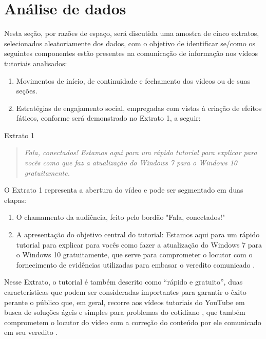 \documentclass[portuguese]{textolivre}
\begin{document}
\section{Análise de dados}\label{sec-organizacao}
Nesta seção, por razões de espaço, será discutida uma amostra de cinco extratos, selecionados aleatoriamente dos dados, com o objetivo de identificar se/como os seguintes componentes estão presentes na comunicação de informação nos vídeos tutoriais analisados: 

\begin{enumerate}
    \item Movimentos de início, de continuidade e fechamento dos vídeos ou de suas seções.
    \item Estratégias de engajamento social, empregadas com vistas à criação de efeitos fáticos, conforme será demonstrado no Extrato 1, a seguir:
\end{enumerate}

\vspace{1ex}
Extrato 1
\begin{quote}
    \textit{Fala, conectados! Estamos aqui para um rápido tutorial para explicar para vocês como que faz a atualização do Windows 7 para o Windows 10 gratuitamente.} 
\end{quote}


	O Extrato 1 representa a abertura do vídeo e pode ser segmentado em duas etapas: 
 
 \begin{enumerate}
    \item O chamamento da audiência, feito pelo bordão "Fala, conectados!"
    \item A apresentação do objetivo central do tutorial: Estamos aqui para um rápido tutorial para explicar para vocês como fazer a atualização do Windows 7 para o Windows 10 gratuitamente, que serve para comprometer o locutor com o fornecimento de evidências utilizadas para embasar o veredito comunicado \cite{labinza2021}.

\end{enumerate}

	Nesse Extrato, o tutorial é também descrito como “rápido e gratuito”, duas características que podem ser consideradas importantes para garantir o êxito perante o público que, em geral, recorre aos vídeos tutoriais do YouTube em busca de soluções ágeis e simples para problemas do cotidiano \cite{mogos2015}, que também comprometem o locutor do vídeo com a correção do conteúdo por ele comunicado em seu veredito \cite{labinza2021}. 
 
\end{document}
